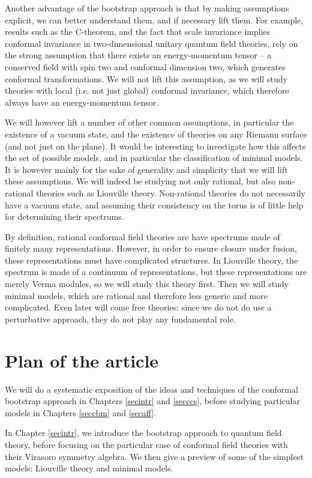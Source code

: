 \documentclass[12pt,a4paper,notitlepage]{report}
\numberwithin{equation}{section}
\theoremstyle{break}
\begin{document}
Another advantage of the bootstrap approach is that by making assumptions explicit, we can better understand them, and if necessary lift them.
For example, results such as the C-theorem, and the fact that scale invariance implies conformal invariance in two-dimensional unitary quantum field theories, rely on the strong assumption that there exists an energy-momentum tensor -- a conserved field with spin two and conformal dimension two, which generates conformal transformations.
We will not lift this assumption, as we will study theories with local (i.e.
not just global) conformal invariance, which therefore always have an energy-momentum tensor.

We will however lift a number of other common assumptions, in particular the existence of a vacuum state, and the existence of theories on any Riemann surface (and not just on the plane).
It would be interesting to investigate how this affects the set of possible models, and in particular the classification of minimal models.
It is however mainly for the sake of generality and simplicity that
we will lift these assumptions.
We will indeed be studying not only rational, but also non-rational theories such as Liouville theory.
Non-rational theories do not necessarily have a vacuum state, and assuming their consistency on the torus is of little help for determining their spectrums. 

By definition, rational conformal field theories are have spectrums made of finitely many representations.
However, in order to ensure closure under fusion, these representations must have complicated structures.
In Liouville theory, the spectrum is made of a continuum of representations, but these representations are merely Verma modules, so we will study this theory first.
Then we will study minimal models, which are rational and therefore less generic and more complicated.
Even later will come free theories: since we do not do use a perturbative approach, they do not play any fundamental role. 


\section{Plan of the article \label{secplan}}

We will do a systematic exposition of the ideas and techniques of the conformal bootstrap approach in Chapters \ref{secintr} and \ref{secccs}, before studying particular models in Chapters \ref{seccbm} and \ref{secaff}.

In Chapter \ref{secintr}, we introduce the bootstrap approach to quantum field theory, before focusing on the particular case of conformal field theories with their Virasoro symmetry algebra.
We then give a preview of some of the simplest models: Liouville theory and minimal models.
\end{document}

